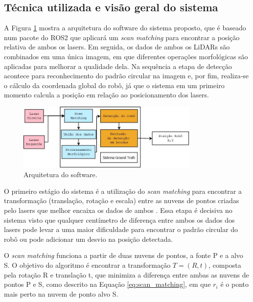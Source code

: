 \documentclass[acronym, symbols, table]{fei}
\begin{document}
			\subsection{Técnica utilizada e visão geral do sistema}
				
				A Figura \ref{fig:software_architecture} mostra a arquitetura do software do sistema proposto, que é baseado num pacote do ROS2 que aplicará um \textit{scan matching} para encontrar a posição relativa de ambos os lasers. Em seguida, os dados de ambos os LiDARs são combinados em uma única imagem, em que diferentes operações morfológicas são aplicadas para melhorar a qualidade dela. Na sequência a etapa de detecção acontece para reconhecimento do padrão circular na imagem e, por fim, realiza-se o cálculo da coordenada global do robô, já que o sistema em um primeiro momento calcula a posição em relação ao posicionamento dos lasers.
					
				\begin{figure}[!htb]
					\centering
					\includegraphics[width=0.80\textwidth]{software_architecture.jpeg}
					\caption{Arquitetura do software.} \label{fig:software_architecture}
				\end{figure}
			
				O primeiro estágio do sistema é a utilização do \textit{scan matching} para encontrar a transformação (translação, rotação e escala) entre as nuvens de pontos criadas pelo lasers que melhor encaixa os dados de ambos \cite{NIETO200739}. Essa etapa é decisiva no sistema visto que qualquer centímetro de diferença entre ambos os dados dos lasers pode levar a uma maior dificuldade para encontrar o padrão circular do robô ou pode adicionar um desvio na posição detectada.
								
				O \textit{scan matching} funciona a partir de duas nuvens de pontos, a fonte P e a alvo S. O objetivo do algoritmo é encontrar a transformação $T = (R, t)$, composta pela rotação R e translação t, que minimiza a diferença entre ambas as nuvens de pontos P e S, como descrito na Equação \ref{eq:scan_matching}, em que $r_i$ é o ponto mais perto na nuvem de ponto alvo S.
				
\end{document}
